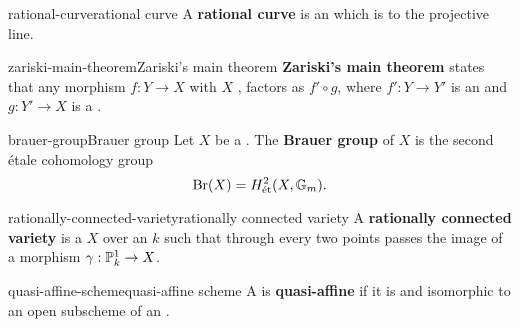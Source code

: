 \begin{topic}{rational-curve}{rational curve}
    A \textbf{rational curve} is an  which is  to the projective line.
\end{topic}

\begin{topic}{zariski-main-theorem}{Zariski's main theorem}
    \textbf{Zariski's main theorem} states that any   morphism $f : Y \to X$ with $X$ , factors as $f' \circ g$, where $f' : Y \to Y'$ is an  and $g : Y' \to X$ is a .
\end{topic}

\begin{topic}{brauer-group}{Brauer group}
    Let $X$ be a . The \textbf{Brauer group} of $X$ is the second étale cohomology group
    \[ \textup{Br}(X) = H^2_\textup{ét}(X, \mathbb{G}_m) . \]
\end{topic}

\begin{topic}{rationally-connected-variety}{rationally connected variety}
    A \textbf{rationally connected variety} is a  $X$ over an  $k$ such that through every two points passes the image of a morphism $\gamma : \mathbb{P}^1_k \to X$.
\end{topic}

\begin{topic}{quasi-affine-scheme}{quasi-affine scheme}
    A  is \textbf{quasi-affine} if it is  and isomorphic to an open subscheme of an .
\end{topic}

